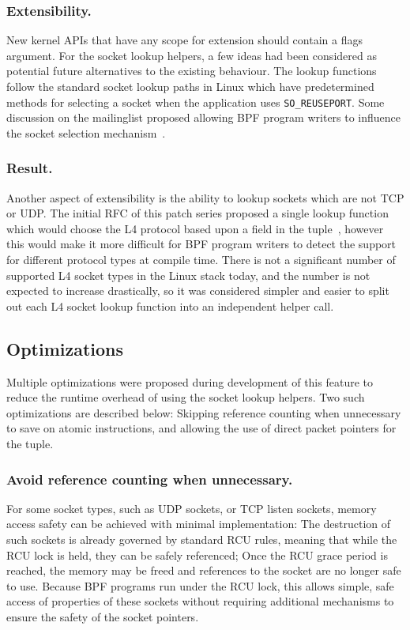 \documentclass[10pt,sigconf,authorversion]{lpc}
\begin{document}
\subsubsection{Extensibility.}

New kernel APIs that have any scope for extension should contain a flags
argument. For the socket lookup helpers, a few ideas had been considered as
potential future alternatives to the existing behaviour. The lookup functions
follow the standard socket lookup paths in Linux which have predetermined
methods for selecting a socket when the application uses \verb+SO_REUSEPORT+.
Some discussion on the mailinglist proposed allowing BPF program writers to
influence the socket selection mechanism~\cite{netdev-sk-select}.

\subsubsection{Result.}

Another aspect of extensibility is the ability to lookup sockets which are not
TCP or UDP. The initial RFC of this patch series proposed a single lookup
function which would choose the L4 protocol based upon a field in the
tuple~\cite{sk-lookup-rfc}, however this would make it more difficult for BPF
program writers to detect the support for different protocol types at compile
time. There is not a significant number of supported L4 socket types in the
Linux stack today, and the number is not expected to increase drastically, so
it was considered simpler and easier to split out each L4 socket lookup
function into an independent helper call.

\subsection{Optimizations}

Multiple optimizations were proposed during development of this feature to
reduce the runtime overhead of using the socket lookup helpers. Two such
optimizations are described below: Skipping reference counting when unnecessary
to save on atomic instructions, and allowing the use of direct packet pointers
for the tuple.

\subsubsection{Avoid reference counting when unnecessary.}

For some socket types, such as UDP sockets, or TCP listen sockets, memory
access safety can be achieved with minimal implementation: The destruction of
such sockets is already governed by standard RCU rules, meaning that while the
RCU lock is held, they can be safely referenced; Once the RCU grace period is
reached, the memory may be freed and references to the socket are no longer
safe to use. Because BPF programs run under the RCU lock, this allows simple,
safe access of properties of these sockets without requiring additional
mechanisms to ensure the safety of the socket pointers.
\end{document}
